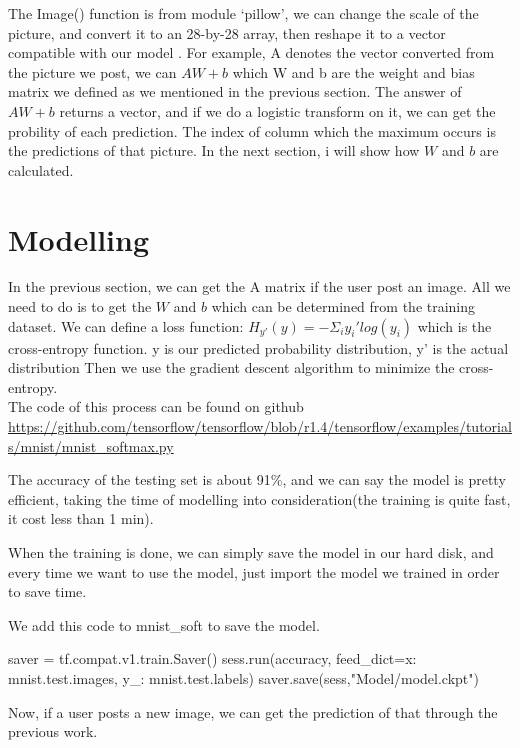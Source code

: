 \documentclass[12pt,hyperref,]{ctexart}
\begin{document}
\newpage

The Image() function is from module `pillow', we can change the scale of
the picture, and convert it to an 28-by-28 array, then reshape it to a
vector compatible with our model . For example, A denotes the vector
converted from the picture we post, we can \(AW+b\) which W and b are
the weight and bias matrix we defined as we mentioned in the previous
section. The answer of \(AW+b\) returns a vector, and if we do a
logistic transform on it, we can get the probility of each prediction.
The index of column which the maximum occurs is the predictions of that
picture. In the next section, i will show how \(W\) and \(b\) are
calculated.

\newpage

\section{Modelling}\label{modelling}

In the previous section, we can get the A matrix if the user post an
image. All we need to do is to get the \(W\) and \(b\) which can be
determined from the training dataset. We can define a loss function:
\(H_{y'}(y)=-\Sigma_i y_i'log(y_i)\) which is the cross-entropy
function. y is our predicted probability distribution, y' is the actual
distribution Then we use the gradient descent algorithm to minimize the
cross-entropy.\\
The code of this process can be found on github
\url{https://github.com/tensorflow/tensorflow/blob/r1.4/tensorflow/examples/tutorials/mnist/mnist_softmax.py}

The accuracy of the testing set is about 91\%, and we can say the model
is pretty efficient, taking the time of modelling into consideration(the
training is quite fast, it cost less than 1 min).

When the training is done, we can simply save the model in our hard
disk, and every time we want to use the model, just import the model we
trained in order to save time.

We add this code to mnist\_soft to save the model.

\begin{python}
  saver = tf.compat.v1.train.Saver()
  sess.run(accuracy, feed_dict={x: mnist.test.images,
                                      y_: mnist.test.labels})
  saver.save(sess,"Model/model.ckpt")
\end{python}

Now, if a user posts a new image, we can get the prediction of that
through the previous work.
\end{document}
